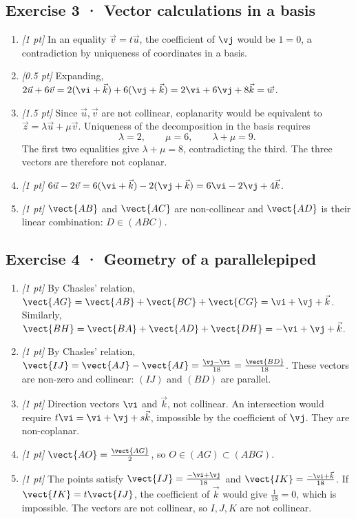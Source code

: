\subsection*{Exercise 3 · Vector calculations in a basis}\begin{enumerate}

\item \textit{[1 pt]} In an equality $\vec v=t\vec u$, the coefficient of $\vj $ would be $1=0$, a contradiction by uniqueness of coordinates in a basis.

\item \textit{[0.5 pt]} Expanding, $2\vec u+6\vec v=2(\vi +\vec k)+6(\vj +\vec k)=2\vi +6\vj +8\vec k=\vec w$.

\item \textit{[1.5 pt]} Since $\vec u,\vec v$ are not collinear, coplanarity would be equivalent to $\vec z=\lambda\vec u+\mu\vec v$. Uniqueness of the decomposition in the basis requires
\[\lambda=2,\qquad\mu=6,\qquad\lambda+\mu=9.\]
The first two equalities give $\lambda+\mu=8$, contradicting the third. The three vectors are therefore not coplanar.

\item \textit{[1 pt]} $6\vec u-2\vec v=6(\vi +\vec k)-2(\vj +\vec k)=6\vi -2\vj +4\vec k$.

\item \textit{[1 pt]} $\vect{AB}$ and $\vect{AC}$ are non-collinear and $\vect{AD}$ is their linear combination: $D\in(ABC)$.

\end{enumerate}

\subsection*{Exercise 4 · Geometry of a parallelepiped}\begin{enumerate}

\item \textit{[1 pt]} By Chasles' relation, $\vect{AG}=\vect{AB}+\vect{BC}+\vect{CG}=\vi +\vj +\vec k$. Similarly, $\vect{BH}=\vect{BA}+\vect{AD}+\vect{DH}=-\vi +\vj +\vec k$.

\item \textit{[1 pt]} By Chasles' relation, $\vect{IJ}=\vect{AJ}-\vect{AI}=\frac{\vj -\vi }{18}=\frac{\vect{BD}}{18}$. These vectors are non-zero and collinear: $(IJ)$ and $(BD)$ are parallel.

\item \textit{[1 pt]} Direction vectors $\vi $ and $\vec k$, not collinear. An intersection would require $t\vi =\vi +\vj +s\vec k$, impossible by the coefficient of $\vj $. They are non-coplanar.

\item \textit{[1 pt]} $\vect{AO}=\frac{\vect{AG}}{2}$, so $O\in(AG)\subset(ABG)$.

\item \textit{[1 pt]} The points satisfy $\vect{IJ}=\frac{-\vi +\vj }{18}$ and $\vect{IK}=\frac{-\vi +\vec k}{18}$. If $\vect{IK}=t\vect{IJ}$, the coefficient of $\vec k$ would give $\frac{1}{18}=0$, which is impossible. The vectors are not collinear, so $I,J,K$ are not collinear.

\end{enumerate}

